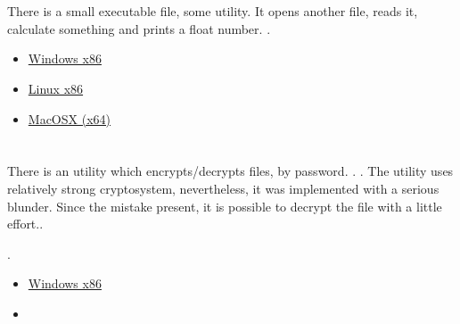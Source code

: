 \section{}

{There is a small executable file, some utility}.
{It opens another file, reads it, calculate something and prints a float number}.
.

\begin{itemize}
\item
\href{http://yurichev.com/RE-exercises/3/3/unknown_utility_2_3.exe}{Windows x86}

\item
\href{http://yurichev.com/RE-exercises/3/3/unknown_utility_2_3_Linux86.tar}{Linux x86}

\item
\href{http://yurichev.com/RE-exercises/3/3/unknown_utility_2_3_MacOSX.tar}{MacOSX (x64)}
\end{itemize}

\section{}

{There is an utility which encrypts/decrypts files, by password}.
.
.
{The utility uses relatively strong cryptosystem, nevertheless, it was implemented with a serious blunder.
Since the mistake present, it is possible to decrypt the file with a little effort.}.

.

\begin{itemize}
\item
\href{http://yurichev.com/RE-exercises/3/4/amateur_cryptor.exe}{Windows x86}

\item
\href{http://yurichev.com/RE-exercises/3/4/text_encrypted}{}
\end{itemize}

